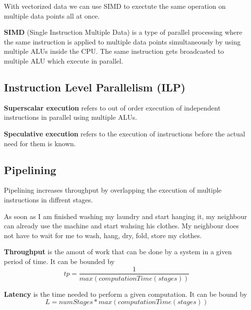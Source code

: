 With vectorized data we can use SIMD to exectute the same operation on multiple data points all at once.

\begin{definition}
    \textbf{SIMD} (Single Instruction Multiple Data) is a type of parallel processing where the same
    instruction is applied to multiple data points simultaneously by using multiple ALUs inside the CPU. The same
    instruction gets broadcasted to multiple ALU which execute in parallel.
\end{definition}

\subsection{Instruction Level Parallelism (ILP)}

\begin{definition}
    \textbf{Superscalar execution} refers to out of order execution of independent instructions in parallel
    using multiple ALUs.
\end{definition}

\begin{definition}
    \textbf{Speculative execution} refers to the execution of instructions before the actual need for them is known.
\end{definition}

\subsection{Pipelining}

Pipelining increases throughput by overlapping the execution of multiple instructions in diffrent stages.

\begin{example}
    As soon as I am finished washing my laundry and start hanging it, my neighbour can already use the
    machine and start wahsing his clothes. My neighbour does not have to wait for me to wash, hang, dry,
    fold, store my clothes.
\end{example}

\begin{definition}
    \textbf{Throughput } is the amout of work that can be done by a system in a given period of time. It can be bounded by
    $$tp = \frac{1}{max(computationTime(stages))}$$
\end{definition}

\begin{definition}
    \textbf{Latency } is the time needed to perform a given computation. It can be bound by
    $$L = numStages * max(computationTime(stages))$$
\end{definition}

